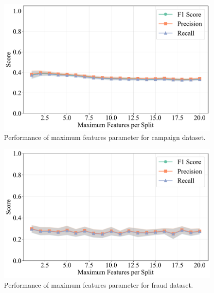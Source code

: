\documentclass[10pt, conference]{IEEEtran}
\begin{document}
\begin{figure}[H]
	\centering
	\includegraphics[width=0.95\linewidth]{../results/campaign/max_features/performance_vs_max_features.pdf}
	\caption{Performance of maximum features parameter for campaign dataset.}
	\label{fig:max_features_campaign}
\end{figure}

\begin{figure}[H]
	\centering
	\includegraphics[width=0.95\linewidth]{../results/fraud/max_features/performance_vs_max_features.pdf}
	\caption{Performance of maximum features parameter for fraud dataset.}
	\label{fig:max_features_fraud}
\end{figure}
\end{document}
